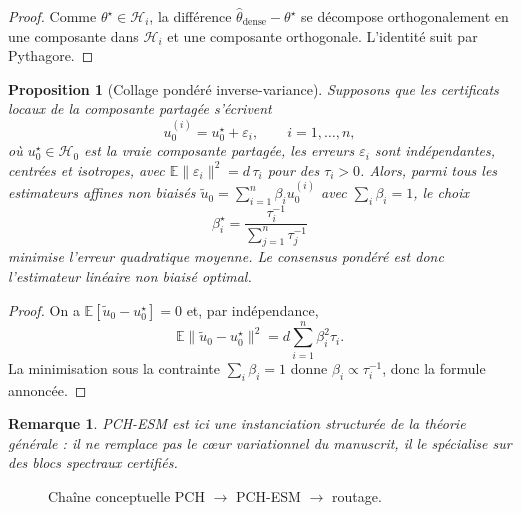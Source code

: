 \documentclass[11pt,a4paper]{article}
\newtheorem{proposition}{Proposition}[section]
\newtheorem{remark}{Remarque}[section]
\DeclareMathOperator{\argmin}{argmin}
\newcommand{\Hh}{\mathcal H}
\begin{document}
\begin{proof}
Comme \(\theta^\star\in\Hh_i\), la différence \(\hat\theta_{\mathrm{dense}}-\theta^\star\) se décompose orthogonalement en une composante dans \(\Hh_i\) et une composante orthogonale. L'identité suit par Pythagore.
\end{proof}

\begin{proposition}[Collage pondéré inverse-variance]
Supposons que les certificats locaux de la composante partagée s'écrivent
\[
u_0^{(i)} = u_0^\star + \varepsilon_i,\qquad i=1,\dots,n,
\]
où \(u_0^\star\in\Hh_0\) est la vraie composante partagée, les erreurs \(\varepsilon_i\) sont indépendantes, centrées et isotropes, avec \(\mathbb E\|\varepsilon_i\|^2 = d\,\tau_i\) pour des \(\tau_i>0\). Alors, parmi tous les estimateurs affines non biaisés \(\tilde u_0=\sum_{i=1}^n \beta_i u_0^{(i)}\) avec \(\sum_i\beta_i=1\), le choix
\[
\beta_i^\star=\frac{\tau_i^{-1}}{\sum_{j=1}^n \tau_j^{-1}}
\]
minimise l'erreur quadratique moyenne. Le consensus pondéré est donc l'estimateur linéaire non biaisé optimal.
\end{proposition}

\begin{proof}
On a \(\mathbb E[\tilde u_0-u_0^\star]=0\) et, par indépendance,
\[
\mathbb E\|\tilde u_0-u_0^\star\|^2
=
d\sum_{i=1}^n \beta_i^2 \tau_i.
\]
La minimisation sous la contrainte \(\sum_i\beta_i=1\) donne \(\beta_i\propto \tau_i^{-1}\), donc la formule annoncée.
\end{proof}

\begin{remark}
PCH-ESM est ici une instanciation structurée de la théorie générale : il ne remplace pas le cœur variationnel du manuscrit, il le spécialise sur des blocs spectraux certifiés.
\end{remark}

\begin{figure}[ht]
\centering
{}
\caption{Chaîne conceptuelle PCH \(\rightarrow\) PCH-ESM \(\rightarrow\) routage.}
\end{figure}
\end{document}
